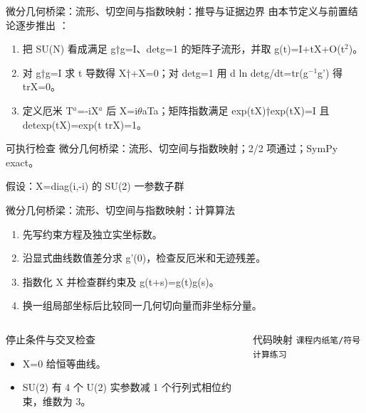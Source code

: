 \begin{frame}[t]{微分几何桥梁：流形、切空间与指数映射：推导与证据边界}
\footnotesize
{}\quad 由本节定义与前置结论逐步推出 ：
\begin{enumerate}
\item 把 SU(N) 看成满足 g†g=I、detg=1 的矩阵子流形，并取 g(t)=I+tX+O(t\ensuremath{^{2}})。
\item 对 g†g=I 求 t 导数得 X†+X=0；对 detg=1 用 d ln detg/\allowbreak{}dt=tr(g\ensuremath{^{-1}}g') 得 trX=0。
\item 定义厄米 T\ensuremath{^{a}}=-iX\ensuremath{^{a}} 后 X=i\ensuremath{\theta}aTa；矩阵指数满足 exp(tX)†exp(tX)=I 且 detexp(tX)=exp(t trX)=1。
\end{enumerate}\begin{block}{可执行检查}
\quad 微分几何桥梁：流形、切空间与指数映射；2/2 项通过；SymPy exact。
\par\scriptsize 假设：X=diag(i,-i) 的 SU(2) 一参数子群
\end{block}
\end{frame}

\begin{frame}[t]{微分几何桥梁：流形、切空间与指数映射：计算算法}
\footnotesize
{}\begin{enumerate}
\item 先写约束方程及独立实坐标数。
\item 沿显式曲线数值差分求 g'(0)，检查反厄米和无迹残差。
\item 指数化 X 并检查群约束及 g(t+s)=g(t)g(s)。
\item 换一组局部坐标后比较同一几何切向量而非坐标分量。
\end{enumerate}\begin{columns}[T,onlytextwidth]
\begin{block}{停止条件与交叉检查}\scriptsize\begin{itemize}
\item[\CheckMark] X=0 给恒等曲线。
\item[\CheckMark] SU(2) 有 4 个 U(2) 实参数减 1 个行列式相位约束，维数为 3。
\end{itemize}\end{block}
\begin{block}{代码映射}
\scriptsize \texttt{课程内纸笔/\allowbreak{}符号计算练习}
\end{block}\end{columns}\end{frame}

